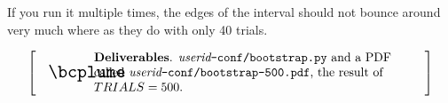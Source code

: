 \documentclass[titlepage]{tufte-book}
\makeatletter
\newenvironment{callout}[1]{
\[
  \left[
      \begin{tabular}{@{\quad}m{.05\textwidth}@{\qquad}m{.75\textwidth}@{\quad}}
        \scalebox{1.5}{#1} & 
          \raggedright%
}
{
      \end{tabular}
    \right]
\]
}
\makeatother
\begin{document}
\begin{fullwidth}

\noindent If you run it multiple times, the edges of the interval should not bounce around very much where as they do with only 40 trials.

\begin{callout}{\bcplume}
{\bf Deliverables}. {\em userid}{\tt -conf/bootstrap.py} and a PDF called {\em userid}{\tt -conf/bootstrap-500.pdf}, the result of $TRIALS=500$.
\end{callout}

\end{fullwidth}
\end{document}
